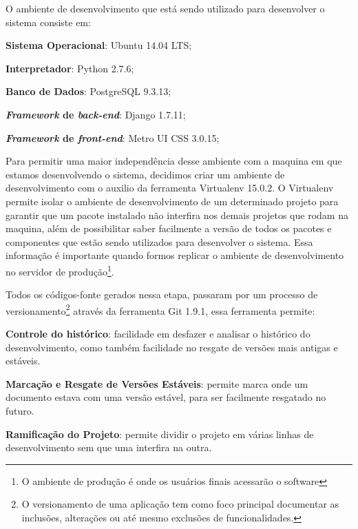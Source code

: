 O ambiente de desenvolvimento que est\'a sendo utilizado para desenvolver o sistema consiste em:
\begin{alineas}
	\item \textbf{Sistema Operacional}: Ubuntu 14.04 LTS;
	\item \textbf{Interpretador}: Python 2.7.6;
	\item \textbf{Banco de Dados}: PostgreSQL 9.3.13;
	\item \textbf{\textit{Framework} de \textit{back-end}}: Django 1.7.11;
	\item \textbf{\textit{Framework} de \textit{front-end}}: Metro UI CSS 3.0.15;
\end{alineas}

Para permitir uma maior independ\^encia desse ambiente com a maquina em que estamos desenvolvendo o sistema, decidimos criar um ambiente de desenvolvimento com o auxilio da 
ferramenta Virtualenv 15.0.2. O Virtualenv permite isolar o ambiente de desenvolvimento de um determinado projeto para garantir que um pacote instalado não interfira nos demais projetos que 
rodam na maquina, al\'em de possibilitar saber facilmente a vers\~ao de todos os pacotes e componentes que est\~ao sendo utilizados para desenvolver o sistema. Essa informa\c{c}\~ao \'e 
importante quando formos replicar o ambiente de desenvolvimento no servidor de produ\c{c}\~ao\footnote{O ambiente de produção é onde os usuários finais acessarão o software}. 

Todos os c\'odigos-fonte gerados nessa etapa, passaram por um processo de versionamento\footnote{O versionamento de uma aplicação tem como 
foco principal documentar as inclusões, alterações ou até mesmo exclusões de funcionalidades.} atrav\'es da ferramenta Git 1.9.1, 
essa ferramenta permite:

\begin{alineascomponto}
	\item \textbf{Controle do histórico}: facilidade em desfazer e analisar o histórico do desenvolvimento, como também facilidade no resgate de versões mais antigas e estáveis.
	\item \textbf{Marca\c{c}\~ao e Resgate de Vers\~oes Est\'aveis}: permite marca onde um documento estava com uma vers\~ao est\'avel, para ser facilmente resgatado no futuro.
	\item \textbf{Ramifica\c{c}\~ao do Projeto}: permite dividir o projeto em v\'arias linhas de desenvolvimento sem que uma interfira na outra. 
\end{alineascomponto}

